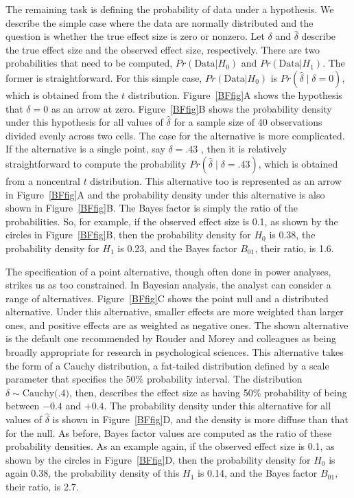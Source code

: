 \documentclass[man]{apa6}
\begin{document}
The remaining task is defining the probability of data under a hypothesis.  We describe the simple case where the data are normally distributed and the question is whether the true effect size is zero or nonzero.  Let $\delta$ and $\hat{\delta}$ describe the true effect size and the observed effect size, respectively.  There are two probabilities that need to be computed,   $Pr(\mbox{Data} | H_0)$ and $Pr(\mbox{Data} | H_1)$.   The former is straightforward.  For this simple case, $Pr(\mbox{Data} | H_0)$ is $Pr(\hat{\delta} \mid \delta=0)$, which is obtained from the $t$ distribution.  Figure~\ref{BFfig}A shows the hypothesis that $\delta=0$ as an arrow at zero.  Figure~\ref{BFfig}B shows the probability density under this hypothesis for all values of $\hat{\delta}$ for a sample size of 40 observations divided evenly across two cells. The case for the alternative is more complicated.  If the alternative is a single point, say $\delta=.43$ \citep[here chosen as an example because $\delta = 0.43$ is the effect size of violent games on aggressive behaviors as described by][]{Anderson:etal:2010}, then it is relatively straightforward to compute the probability $Pr(\hat{\delta} \mid \delta=.43)$, which is obtained from a noncentral $t$ distribution.   This alternative too is represented as an arrow in Figure~\ref{BFfig}A and the probability density under this alternative is also shown in Figure~\ref{BFfig}B. The Bayes factor is simply the ratio of the probabilities.  So, for example, if the observed effect size is 0.1, as shown by the circles in Figure~\ref{BFfig}B, then the probability density for $H_0$ is 0.38, the probability density for $H_1$ is 0.23, and the Bayes factor $B_{01}$, their ratio, is 1.6. 

The specification of a point alternative, though often done in power analyses, strikes us as too constrained.  In Bayesian analysis, the analyst can consider a range of alternatives.  Figure~\ref{BFfig}C shows the point null and a distributed alternative.  Under this alternative, smaller effects are more weighted than larger ones, and positive effects are as weighted as negative ones.  The shown alternative is the default one recommended by Rouder and Morey and colleagues \citep{Rouder:etal:2009a,Morey:Rouder:2011,Rouder:Morey:2012,Rouder:etal:2012} as being broadly appropriate for research in psychological sciences. This alternative takes the form of a Cauchy distribution, a fat-tailed distribution defined by a scale parameter that specifies the $50\%$ probability interval. The distribution $\delta \sim \mbox{Cauchy(.4)}$, then, describes the effect size as having 50\% probability of being between $-0.4$ and $+0.4$. The probability density under this alternative for all values of $\hat{\delta}$ is shown in Figure~\ref{BFfig}D, and the density is more diffuse than that for the null.   As before, Bayes factor values are computed as the ratio of these probability densities. As an example again, if the observed effect size is 0.1, as shown by the circles in Figure~\ref{BFfig}D, then the probability density for $H_0$ is again 0.38, the probability density of this $H_1$ is 0.14, and the Bayes factor $B_{01}$, their ratio, is 2.7.
\end{document}
